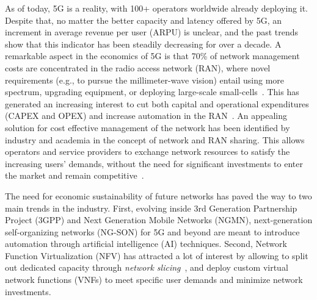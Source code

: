 \documentclass[journal]{IEEEtran}
\begin{document}
	As of today, 5G is a reality, with 100+ operators worldwide already deploying it. Despite that, no matter the better capacity and latency offered by 5G, an increment in average revenue per user (ARPU) is unclear, and the past trends show that this indicator has been steadily decreasing for over a decade. A remarkable aspect in the economics of 5G is that 70\% of network management costs are concentrated in the radio access network (RAN), where novel requirements (e.g., to pursue the millimeter-wave vision) entail using more spectrum, upgrading equipment, or deploying large-scale small-cells~\cite{webb20185g}. This has generated an increasing interest to cut both capital and operational expenditures (CAPEX and OPEX) and increase automation in the RAN~\cite{ORANall}. An appealing solution for cost effective management of the network has been identified by industry and academia in the concept of network and RAN sharing. This allows operators and service providers to exchange network resources to satisfy the increasing users' demands, without the need for significant investments to enter the market and remain competitive~\cite{samdanis2016network}. %
	
	
	The need for economic sustainability of future networks has paved the way to two main trends in the industry. First, evolving inside 3rd Generation Partnership Project (3GPP) and Next Generation Mobile Networks (NGMN), next-generation self-organizing networks (NG-SON) for 5G and beyond are meant to introduce automation through artificial intelligence (AI) techniques. Second, Network Function Virtualization (NFV) has attracted a lot of interest by allowing to split out dedicated capacity through \textit{network slicing}~\cite{foukas2017network}, and deploy custom virtual network functions (VNFs) to meet specific user demands and minimize network investments.%
	
\end{document}
